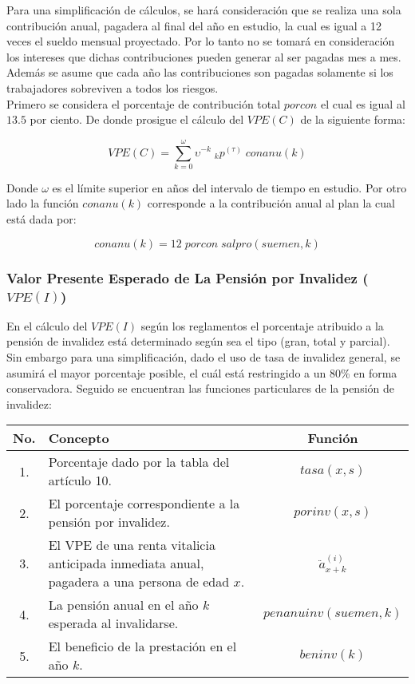 \documentclass[12pt,letterpaper,titlepage]{article}
\begin{document}
{Para una simplificación de cálculos, se hará consideración que se realiza una sola contribución anual, pagadera al final del año en estudio, la cual es igual a 12 veces el sueldo mensual proyectado. Por lo tanto no se tomará en consideración los intereses que dichas contribuciones pueden generar al ser pagadas mes a  mes. Además se asume que cada año las contribuciones son pagadas solamente si los trabajadores sobreviven a todos los riesgos.\\

Primero se considera el porcentaje de contribución total $porcon$ el cual es igual al $13.5$ por ciento. De donde prosigue el cálculo del $V\!PE(C)$ de la siguiente forma:

\begin{equation*}
V\!PE(C)=\sum \limits_{k=0}^\omega \upsilon^{-k}\;_{k}p^{(\tau)}\;conanu(k)
\end{equation*}

Donde $\omega$ es el límite superior en años del intervalo de tiempo en estudio. Por otro lado la función $conanu(k)$ corresponde a la contribución anual al plan la cual está dada por:


\begin{equation*}
conanu(k)=12\;porcon\;sal\!pro(suemen,k)
\end{equation*}

\subsubsection{Valor Presente Esperado de La Pensión por Invalidez ($V\!PE(I)$)}

En el cálculo del $V\!PE(I)$ según los reglamentos el porcentaje atribuido a la pensión de invalidez está determinado según sea el tipo (gran, total y parcial). Sin embargo para una simplificación, dado el uso de tasa de invalidez general, se asumirá el mayor porcentaje posible, el cuál está restringido a un 80\% en forma conservadora. Seguido se encuentran las funciones particulares de la pensión de invalidez:\\

\begin{center}
	\begin{tabular}{|c||p{8cm}||c|}%
		\hline 
		\rule[-1ex]{0pt}{2.5ex} No. & Concepto & Función \\ 
		\hline 
		\hline 
		\rule[-1ex]{0pt}{2.5ex} 1. & Porcentaje dado por la tabla del artículo 10. & $tasa(x,s)$ \\ 
		\hline 
		\rule[-1ex]{0pt}{2.5ex} 2. & El porcentaje correspondiente a la pensión por invalidez. &  $porinv(x,s)$ \\ 
		\hline 
		\rule[-1ex]{0pt}{2.5ex} 3. & El VPE de una renta vitalicia anticipada inmediata anual, pagadera a una persona de edad $x$. &$\ddot{a}^{(i)}_{x+k}$\\
		\hline
		\rule[-1ex]{0pt}{2.5ex} 4. & La pensión anual en el año $k$ esperada al invalidarse. & $penanuinv(suemen,k)$ \\ 
		\hline 
		\rule[-1ex]{0pt}{2.5ex} 5. & El beneficio de la prestación en el año $k$. & $beninv(k)$ \\ 
		\hline 
	\end{tabular}
\end{center}

}
\end{document}
